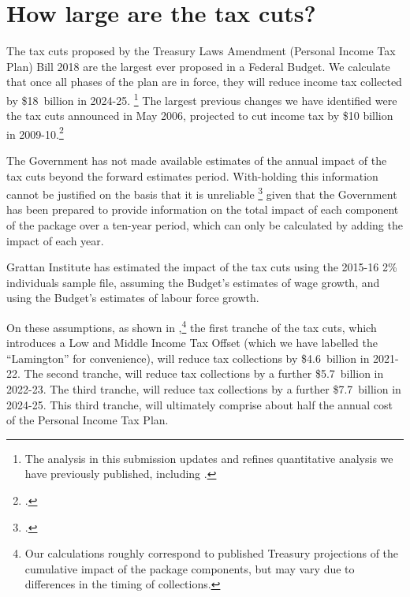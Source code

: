 \documentclass[submission]{grattan}
\begin{document}
\chapter{How large are the tax cuts?}\label{chap:how-large-are-the-tax-cuts}

The tax cuts proposed by the Treasury Laws Amendment (Personal Income Tax Plan) Bill 2018 are the largest ever proposed in a Federal Budget. We calculate that once all phases of the plan are in force, they will reduce income tax collected by \$18~billion in 2024-25.%
  \footnote{The analysis in this submission updates and refines quantitative analysis we have previously published, including \textcite{DaleyWood2018}.}
The largest previous changes we have identified were the tax cuts announced in May 2006, projected to cut income tax by \$10 billion in 2009-10.\footcite[][23]{Treasury2006}

The Government has not made available estimates of the annual impact of the tax cuts beyond the forward estimates period. With-holding this information cannot be justified on the basis that it is unreliable%
  \footcite{Murphy2018}
given that the Government has been prepared to provide information on the total impact of each component of the package over a ten-year period, which can only be calculated by adding the impact of each year.

Grattan Institute has estimated the impact of the tax cuts using the 2015-16 2\% individuals sample file, assuming the Budget's estimates of wage growth, and using the Budget's estimates of labour force growth.

On these assumptions, as shown in  ,\footnote{Our calculations roughly correspond to published Treasury projections of the cumulative impact of the package components, but may vary due to differences in the timing of collections.}
the first tranche of the tax cuts, which introduces a Low and Middle Income Tax Offset (which we have labelled the ``Lamington'' for convenience), will reduce tax collections by \$4.6~billion in 2021-22. The second tranche, will reduce tax collections by a further \$5.7~billion in 2022-23. The third tranche, will reduce tax collections by a further \$7.7~billion in 2024-25. This third tranche, will ultimately comprise about half the annual cost of the Personal Income Tax Plan.
\end{document}
